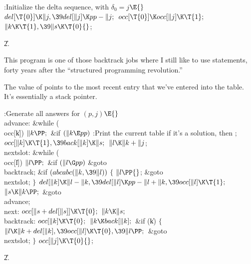 \B{}:Initialize the delta sequence, with $\delta_0=j$\X${}\E{}$\6
$\\{del}[\T{0}]\K\|j,\39\\{del}[\|j]\K\\{pp}-\|j;{}$\6
${}\\{occ}[\T{0}]\K\\{occ}[\|j]\K\T{1};{}$\6
${}\|k\K\T{1},\39\|s\K\T{0}{}$;\par
\U2.\fi

This program is one of those backtrack jobs
where I still like to use  statements,
forty years after the ``structured programming revolution.''

The value of  points to the most recent entry that we've entered
into the  table. It's essentially a stack pointer.

\Y\B\4:Generate all answers for $(p,j)$\X${}\E{}$\6
\4\\{advance}:\5
\&{while} (\\{occ}[\|k])\1\5
${}\|k\PP;{}$\2\6
\&{if} ${}(\|k\E\\{pp}){}$\1\5
:Print the current  table if it's a solution, then \X;\2\6
${}\\{occ}[\|k]\K\T{1},\39\\{back}[\|k]\K\|s;{}$\6
${}\|l\K\|k+\|j{}$;\6
\4\\{nextslot}:\5
\&{while} (\\{occ}[\|l])\1\5
${}\|l\PP;{}$\2\6
\&{if} ${}(\|l\G\\{pp}){}$\1\5
\&{goto} \\{backtrack};\2\6
\&{if} ${}(\\{abcabc}(\|k,\39\|l)){}$\5
${}\{{}$\1\6
${}\|l\PP{}$;\5
\&{goto} \\{nextslot};\6
\4${}\}{}$\2\6
${}\\{del}[\|k]\K\|l-\|k,\39\\{del}[\|l]\K\\{pp}-\|l+\|k,\39\\{occ}[\|l]\K%
\T{1};{}$\6
${}\|s\K\|k\PP;{}$\6
\&{goto} \\{advance};\6
\4\\{next}:\5
${}\\{occ}[\|s+\\{del}[\|s]]\K\T{0};{}$\6
${}\|k\K\|s;{}$\6
\4\\{backtrack}:\5
${}\\{occ}[\|k]\K\T{0};{}$\6
${}\|k\K\\{back}[\|k];{}$\6
\&{if} (\|k)\5
${}\{{}$\1\6
${}\|l\K\|k+\\{del}[\|k],\39\\{occ}[\|l]\K\T{0},\39\|l\PP;{}$\6
\&{goto} \\{nextslot};\6
\4${}\}{}$\2\6
${}\\{occ}[\|j]\K\T{0}{}$;\par
\U2.\fi

